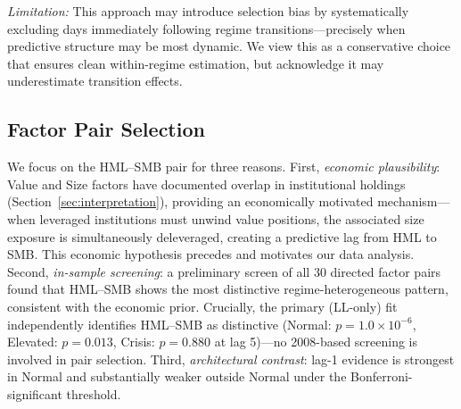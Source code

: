 \documentclass[sigconf,anonymous]{acmart}
\begin{document}
\emph{Limitation:} This approach may introduce selection bias by systematically
excluding days immediately following regime transitions---precisely when predictive
structure may be most dynamic. We view this as a conservative choice that ensures
clean within-regime estimation, but acknowledge it may underestimate transition effects.

\subsection{Factor Pair Selection}
\label{sec:pairselection}

We focus on the HML--SMB pair for three reasons. First, \emph{economic
plausibility}: Value and Size factors have documented overlap in institutional
holdings (Section~\ref{sec:interpretation}), providing an economically motivated
mechanism---when leveraged institutions must unwind value positions, the associated
size exposure is simultaneously deleveraged, creating a predictive lag from HML
to SMB. This economic hypothesis precedes and motivates our data analysis.
Second, \emph{in-sample screening}: a preliminary screen of all 30 directed
factor pairs found that HML--SMB shows the most distinctive regime-heterogeneous
pattern, consistent with the economic prior. Crucially, the primary (LL-only) fit
independently identifies HML--SMB as distinctive (Normal: $p = 1.0 \times 10^{-6}$,
Elevated: $p = 0.013$, Crisis: $p = 0.880$ at lag 5)---no 2008-based screening is
involved in pair selection.
Third, \emph{architectural contrast}: lag-1 evidence is strongest in Normal and
substantially weaker outside Normal under the Bonferroni-significant threshold.
\end{document}
